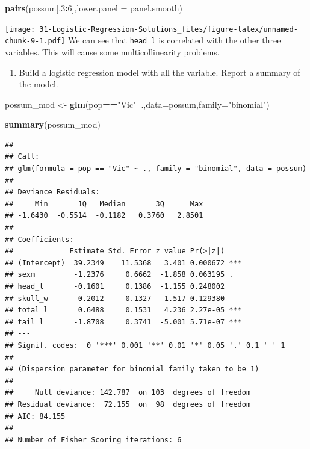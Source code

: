 \documentclass[
]{book}
\newenvironment{Shaded}{\begin{snugshade}}{\end{snugshade}}
\newcommand{\DataTypeTok}[1]{\textcolor[rgb]{0.13,0.29,0.53}{#1}}
\newcommand{\DecValTok}[1]{\textcolor[rgb]{0.00,0.00,0.81}{#1}}
\newcommand{\KeywordTok}[1]{\textcolor[rgb]{0.13,0.29,0.53}{\textbf{#1}}}
\newcommand{\NormalTok}[1]{#1}
\newcommand{\OperatorTok}[1]{\textcolor[rgb]{0.81,0.36,0.00}{\textbf{#1}}}
\newcommand{\StringTok}[1]{\textcolor[rgb]{0.31,0.60,0.02}{#1}}
\providecommand{\tightlist}{%
  \setlength{\itemsep}{0pt}\setlength{\parskip}{0pt}}
\begin{document}
\begin{Shaded}
\begin{Highlighting}[]
\KeywordTok{pairs}\NormalTok{(possum[,}\DecValTok{3}\OperatorTok{:}\DecValTok{6}\NormalTok{],}\DataTypeTok{lower.panel =}\NormalTok{ panel.smooth)}
\end{Highlighting}
\end{Shaded}

\texttt{[image: 31-Logistic-Regression-Solutions\_files/figure-latex/unnamed-chunk-9-1.pdf]}
We can see that \texttt{head\_l} is correlated with the other three variables. This will cause some multicollinearity problems.

\begin{enumerate}
\def\labelenumi{\alph{enumi}.}
\setcounter{enumi}{1}
\tightlist
\item
  Build a logistic regression model with all the variable. Report a summary of the model.
\end{enumerate}

\begin{Shaded}
\begin{Highlighting}[]
\NormalTok{possum_mod <-}\StringTok{ }\KeywordTok{glm}\NormalTok{(pop}\OperatorTok{==}\StringTok{"Vic"}\OperatorTok{~}\NormalTok{.,}\DataTypeTok{data=}\NormalTok{possum,}\DataTypeTok{family=}\StringTok{"binomial"}\NormalTok{)}
\end{Highlighting}
\end{Shaded}

\begin{Shaded}
\begin{Highlighting}[]
\KeywordTok{summary}\NormalTok{(possum_mod)}
\end{Highlighting}
\end{Shaded}

\begin{verbatim}
## 
## Call:
## glm(formula = pop == "Vic" ~ ., family = "binomial", data = possum)
## 
## Deviance Residuals: 
##     Min       1Q   Median       3Q      Max  
## -1.6430  -0.5514  -0.1182   0.3760   2.8501  
## 
## Coefficients:
##             Estimate Std. Error z value Pr(>|z|)    
## (Intercept)  39.2349    11.5368   3.401 0.000672 ***
## sexm         -1.2376     0.6662  -1.858 0.063195 .  
## head_l       -0.1601     0.1386  -1.155 0.248002    
## skull_w      -0.2012     0.1327  -1.517 0.129380    
## total_l       0.6488     0.1531   4.236 2.27e-05 ***
## tail_l       -1.8708     0.3741  -5.001 5.71e-07 ***
## ---
## Signif. codes:  0 '***' 0.001 '**' 0.01 '*' 0.05 '.' 0.1 ' ' 1
## 
## (Dispersion parameter for binomial family taken to be 1)
## 
##     Null deviance: 142.787  on 103  degrees of freedom
## Residual deviance:  72.155  on  98  degrees of freedom
## AIC: 84.155
## 
## Number of Fisher Scoring iterations: 6
\end{verbatim}
\end{document}

